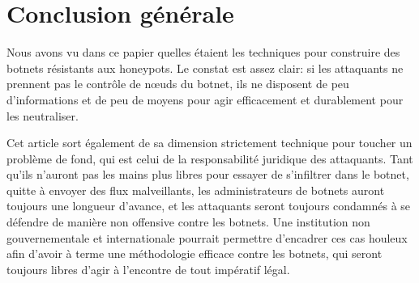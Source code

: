 \section*{Conclusion générale}

Nous avons vu dans ce papier quelles étaient les techniques pour construire
des botnets résistants aux honeypots. Le constat est assez clair: si
les attaquants ne prennent pas le contrôle de nœuds du botnet,
ils ne disposent de peu d'informations et de peu de moyens pour agir efficacement
et durablement pour les neutraliser.

Cet article sort également de sa dimension strictement technique pour toucher un
problème de fond, qui est celui de la responsabilité juridique des attaquants.
Tant qu'ils n'auront pas les mains plus libres pour essayer de s'infiltrer dans
le botnet, quitte à envoyer des flux malveillants, les administrateurs de
botnets auront toujours une longueur d'avance, et les attaquants seront toujours
condamnés à se défendre de manière non offensive contre les botnets.  Une
institution non gouvernementale et internationale pourrait permettre d'encadrer
ces cas houleux afin d'avoir à terme une méthodologie efficace contre les
botnets, qui seront toujours libres d'agir à l'encontre de tout impératif légal.
